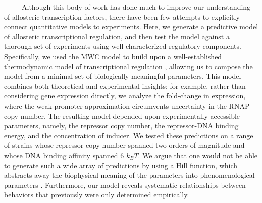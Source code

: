 \documentclass[12pt]{caltech_thesis}
\begin{document}
~~~~~Although this body of work has done much to improve our
understanding of allosteric transcription factors, there have been few
attempts to explicitly connect quantitative models to experiments. Here,
we generate a predictive model of allosteric transcriptional regulation,
and then test the model against a thorough set of experiments using
well-characterized regulatory components. Specifically, we used the MWC
model to build upon a well-established thermodynamic model of
transcriptional regulation \autocite{bintu2005a,garcia2011}, allowing us
to compose the model from a minimal set of biologically meaningful
parameters. This model combines both theoretical and experimental
insights; for example, rather than considering gene expression directly,
we analyze the fold-change in expression, where the weak promoter
approximation circumvents uncertainty in the RNAP copy number. The
resulting model depended upon experimentally accessible parameters,
namely, the repressor copy number, the repressor-DNA binding energy, and
the concentration of inducer. We tested these predictions on a range of
strains whose repressor copy number spanned two orders of magnitude and
whose DNA binding affinity spanned 6 \(k_BT\). We argue that one would
not be able to generate such a wide array of predictions by using a Hill
function, which abstracts away the biophysical meaning of the parameters
into phenomenological parameters \autocite{forsen1995}. Furthermore, our
model reveals systematic relationships between behaviors that previously
were only determined empirically.
\end{document}
